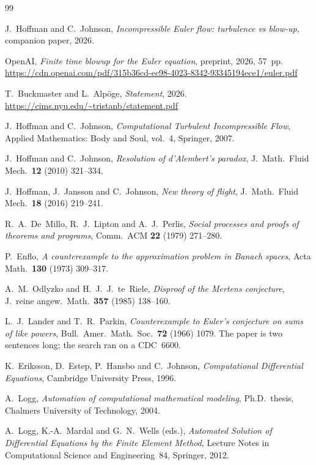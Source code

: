 \documentclass[11pt]{article}
\begin{document}
\begin{thebibliography}{99}

 J.~Hoffman and C.~Johnson, \emph{Incompressible Euler flow: turbulence vs blow-up},
companion paper, 2026.

 OpenAI, \emph{Finite time blowup for the Euler equation}, preprint, 2026,
57~pp.
\newblock \url{https://cdn.openai.com/pdf/315b36cd-ec98-4023-8342-93345194ece1/euler.pdf}

 T.~Buckmaster and L.~Alp\"oge, \emph{Statement}, 2026.
\newblock \url{https://cims.nyu.edu/~tristanb/statement.pdf}

 J.~Hoffman and C.~Johnson, \emph{Computational Turbulent Incompressible Flow},
Applied Mathematics: Body and Soul, vol.~4, Springer, 2007.

 J.~Hoffman and C.~Johnson, \emph{Resolution of d'Alembert's paradox},
J.\ Math.\ Fluid Mech.\ \textbf{12} (2010) 321--334.

 J.~Hoffman, J.~Jansson and C.~Johnson, \emph{New theory of flight},
J.\ Math.\ Fluid Mech.\ \textbf{18} (2016) 219--241.

 R.~A.~De~Millo, R.~J.~Lipton and A.~J.~Perlis, \emph{Social processes and proofs of
theorems and programs}, Comm.\ ACM \textbf{22} (1979) 271--280.

 P.~Enflo, \emph{A counterexample to the approximation problem in Banach spaces},
Acta Math.\ \textbf{130} (1973) 309--317.

 A.~M.~Odlyzko and H.~J.~J.~te~Riele, \emph{Disproof of the Mertens conjecture},
J.\ reine angew.\ Math.\ \textbf{357} (1985) 138--160.

 L.~J.~Lander and T.~R.~Parkin, \emph{Counterexample to Euler's conjecture on
sums of like powers}, Bull.\ Amer.\ Math.\ Soc.\ \textbf{72} (1966) 1079. The paper is two sentences
long; the search ran on a CDC~6600.

 K.~Eriksson, D.~Estep, P.~Hansbo and C.~Johnson, \emph{Computational Differential
Equations}, Cambridge University Press, 1996.

 A.~Logg, \emph{Automation of computational mathematical modeling}, Ph.D.\ thesis,
Chalmers University of Technology, 2004.

 A.~Logg, K.-A.~Mardal and G.~N.~Wells (eds.), \emph{Automated Solution of
Differential Equations by the Finite Element Method}, Lecture Notes in Computational Science and
Engineering~84, Springer, 2012.

\end{thebibliography}
\end{document}
